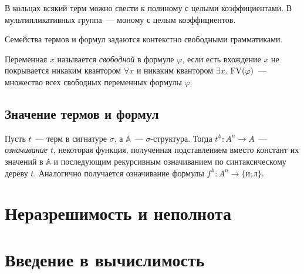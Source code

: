 \documentclass[a4paper,11pt]{article}
\begin{document}
\begin{exmpl}
	В кольцах всякий терм можно свести к полиному с целыми коэффициентами. В мультипликативных группа~— моному с целым коэффициентов.
\end{exmpl}

\begin{task}
	Семейства термов и формул задаются контекстно свободными грамматиками.
\end{task}

\begin{definition}
	Переменная $x$ называется \emph{свободной} в формуле $\varphi$, если есть вхождение $x$ не покрывается никаким квантором $\forall x$ и никаким квантором $\exists x$. $\operatorname{FV}(\varphi)$~— множество всех свободных переменных формулы $\varphi$.
\end{definition}

\subsection{Значение термов и формул}

\begin{definition}
	Пусть $t$~— терм в сигнатуре $\sigma$, а $\mathbb{A}$~— $\sigma$-структура. Тогда $t^{\mathbb{A}}: A^n \to A$~— \emph{означивание $t$}, некоторая функция, полученная подставлением вместо констант их значений в $\mathbb{A}$ и последующим рекурсивным означиванием по синтаксическому дереву $t$. Аналогично получается означивание формулы $f^{\mathbb{A}}: A^n \to \{\text{и}; \text{л}\}$.
\end{definition}

\section{Неразрешимость и неполнота}

\section{Введение в вычислимость}

\end{document}
